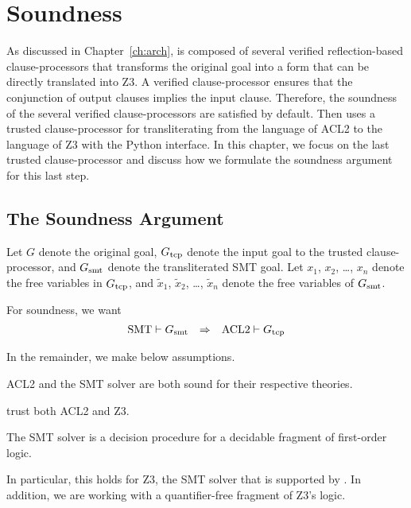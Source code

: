 \chapter{Soundness}
\label{ch:soundness}

As discussed in Chapter~\ref{ch:arch}, \smtlink{} is composed of several
verified reflection-based clause-processors that transforms the original goal
into a form that can be directly translated into Z3.
A verified clause-processor ensures that the conjunction of output clauses
implies the input clause.
Therefore, the soundness of the several verified clause-processors are satisfied
by default.
Then \smtlink{} uses a trusted clause-processor for transliterating from the
language of ACL2 to the language of Z3 with the Python interface.
In this chapter, we focus on the last trusted clause-processor and discuss how
we formulate the soundness argument for this last step.

\section{The Soundness Argument}\label{sec:soundarg}
Let $G$ denote the original goal, $G_{\mathrm{tcp}}$ denote the input goal to the trusted
clause-processor, and $G_{\mathrm{smt}}$ denote the transliterated \acs{SMT} goal. Let
$x_1$, $x_2$, \ldots, $x_n$ denote the free variables in $G_{\mathrm{tcp}}$, and
$\tilde{x}_1$, $\tilde{x}_2$, \ldots, $\tilde{x}_n$ denote the free variables of
$G_{\mathrm{smt}}$.

For soundness, we want
\begin{equation}\label{eq:soundness}\begin{array}{rcl}
\mathrm{SMT} \vdash G_{\mathrm{smt}} &\Rightarrow& \mathrm{ACL2} \vdash G_{\mathrm{tcp}}
\end{array}\end{equation}

In the remainder, we make below assumptions.
\begin{assumption}
  ACL2 and the \acs{SMT} solver are both sound for their respective
  theories.
\end{assumption}
\smtlink{} trust both ACL2 and Z3.

\begin{assumption}
  The \acs{SMT} solver is a decision procedure for a decidable fragment of
  first-order logic.
\end{assumption}
In particular, this holds for Z3, the \acs{SMT} solver that is supported
by \smtlink{}.
In addition, we are working with a quantifier-free fragment of Z3's
logic.

